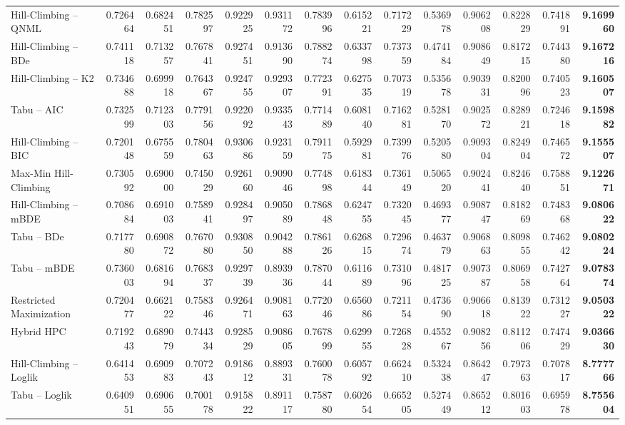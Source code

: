 \documentclass[twoside,twocolumn]{article}
\begin{document}
\begin{table}
{\begin{tabularx}{1.3\textwidth}{lrrrrrrrrrrrrr}
Hill-Climbing – QNML & 0.726464 & 0.682451 & 0.782597 & 0.922925 & 0.931172 & 0.783996 & 0.615221 & 0.717229 & 0.536978 & 0.906208 & 0.822829 & 0.741891 & \textbf{9.169960}\\
Hill-Climbing – BDe & 0.741118 & 0.713257 & 0.767841 & 0.927451 & 0.913690 & 0.788274 & 0.633798 & 0.737359 & 0.474184 & 0.908649 & 0.817215 & 0.744380 & \textbf{9.167216}\\
Hill-Climbing – K2 & 0.734688 & 0.699918 & 0.764367 & 0.924755 & 0.929307 & 0.772391 & 0.627535 & 0.707319 & 0.535678 & 0.903931 & 0.820096 & 0.740523 & \textbf{9.160507}\\
Tabu – AIC & 0.732599 & 0.712303 & 0.779156 & 0.922092 & 0.933543 & 0.771489 & 0.608140 & 0.716281 & 0.528170 & 0.902572 & 0.828921 & 0.724618 & \textbf{9.159882}\\
Hill-Climbing – BIC & 0.720148 & 0.675559 & 0.780463 & 0.930686 & 0.923159 & 0.791175 & 0.592981 & 0.739976 & 0.520580 & 0.909304 & 0.824904 & 0.746572 & \textbf{9.155507}\\
Max-Min Hill-Climbing & 0.730592 & 0.690000 & 0.745029 & 0.926160 & 0.909046 & 0.774898 & 0.618344 & 0.736149 & 0.506520 & 0.902441 & 0.824640 & 0.758851 & \textbf{9.122671}\\
Hill-Climbing – mBDE & 0.708684 & 0.691003 & 0.758941 & 0.928497 & 0.905089 & 0.786848 & 0.624755 & 0.732045 & 0.469377 & 0.908747 & 0.818269 & 0.748368 & \textbf{9.080622}\\
Tabu – BDe & 0.717780 & 0.690872 & 0.767080 & 0.930850 & 0.904288 & 0.786126 & 0.626815 & 0.729674 & 0.463779 & 0.906863 & 0.809855 & 0.746242 & \textbf{9.080224}\\
Tabu – mBDE & 0.736003 & 0.681694 & 0.768337 & 0.929739 & 0.893936 & 0.787044 & 0.611689 & 0.731096 & 0.481725 & 0.907387 & 0.806958 & 0.742764 & \textbf{9.078374}\\
Restricted Maximization & 0.720477 & 0.662122 & 0.758346 & 0.926471 & 0.908163 & 0.772046 & 0.656086 & 0.721154 & 0.473690 & 0.906618 & 0.813922 & 0.731227 & \textbf{9.050322}\\
Hybrid HPC & 0.719243 & 0.689079 & 0.744334 & 0.928529 & 0.908605 & 0.767899 & 0.629955 & 0.726828 & 0.455267 & 0.908256 & 0.811206 & 0.747429 & \textbf{9.036630}\\
Hill-Climbing – Loglik & 0.641453 & 0.690983 & 0.707243 & 0.918612 & 0.889331 & 0.760078 & 0.605792 & 0.662410 & 0.532438 & 0.864247 & 0.797363 & 0.707817 & \textbf{8.777766}\\
Tabu – Loglik & 0.640951 & 0.690655 & 0.700178 & 0.915822 & 0.891117 & 0.758780 & 0.602654 & 0.665205 & 0.527449 & 0.865212 & 0.801603 & 0.695978 &\textbf{ 8.755604}\\

\end{tabularx}}
\end{table}
\end{document}
